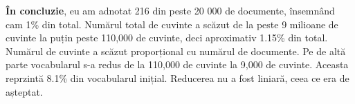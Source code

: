 \textbf{În concluzie}, eu am adnotat 216 din peste 20 000 de documente, însemnând cam 1\% din total. Numărul total de cuvinte a scăzut de la peste 9 milioane de cuvinte la puțin peste 110,000 de cuvinte, deci aproximativ 1.15\% din total. Numărul de cuvinte a scăzut proporțional cu numărul de documente. Pe de altă parte vocabularul s-a redus de la 110,000 de cuvinte la 9,000 de cuvinte. Aceasta reprzintă 8.1\% din vocabularul inițial. Reducerea nu a fost liniară, ceea ce era de așteptat.





